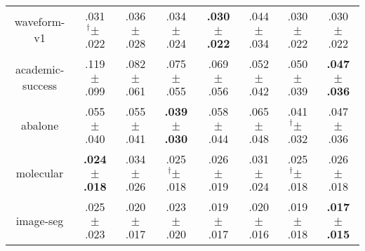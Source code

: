 \begin{tabular}{|c|ccccccc|}
waveform-v1 & .031$^{\dag}\pm^{\phantom{\dag}}$.022\cellcolor{green!34} & .036$^{\phantom{\dag}}\pm^{\phantom{\dag}}$.028\cellcolor{green!3} & .034$^{\phantom{\dag}}\pm^{\phantom{\dag}}$.024\cellcolor{green!16} & \textbf{.030$^{\phantom{\dag}}\pm^{\phantom{\dag}}$.022}\cellcolor{green!40} & .044$^{\phantom{\dag}}\pm^{\phantom{\dag}}$.034\cellcolor{red!40} & .030$^{\phantom{\dag}}\pm^{\phantom{\dag}}$.022\cellcolor{green!36} & .030$^{\phantom{\dag}}\pm^{\phantom{\dag}}$.022\cellcolor{green!36} \\
academic-success & .119$^{\phantom{\dag}}\pm^{\phantom{\dag}}$.099\cellcolor{red!40} & .082$^{\phantom{\dag}}\pm^{\phantom{\dag}}$.061\cellcolor{green!1} & .075$^{\phantom{\dag}}\pm^{\phantom{\dag}}$.055\cellcolor{green!8} & .069$^{\phantom{\dag}}\pm^{\phantom{\dag}}$.056\cellcolor{green!15} & .052$^{\phantom{\dag}}\pm^{\phantom{\dag}}$.042\cellcolor{green!34} & .050$^{\phantom{\dag}}\pm^{\phantom{\dag}}$.039\cellcolor{green!36} & \textbf{.047$^{\phantom{\dag}}\pm^{\phantom{\dag}}$.036}\cellcolor{green!40} \\
abalone & .055$^{\phantom{\dag}}\pm^{\phantom{\dag}}$.040\cellcolor{red!7} & .055$^{\phantom{\dag}}\pm^{\phantom{\dag}}$.041\cellcolor{red!8} & \textbf{.039$^{\phantom{\dag}}\pm^{\phantom{\dag}}$.030}\cellcolor{green!40} & .058$^{\phantom{\dag}}\pm^{\phantom{\dag}}$.044\cellcolor{red!17} & .065$^{\phantom{\dag}}\pm^{\phantom{\dag}}$.048\cellcolor{red!40} & .041$^{\dag}\pm^{\phantom{\dag}}$.032\cellcolor{green!35} & .047$^{\phantom{\dag}}\pm^{\phantom{\dag}}$.036\cellcolor{green!15} \\
molecular & \textbf{.024$^{\phantom{\dag}}\pm^{\phantom{\dag}}$.018}\cellcolor{green!40} & .034$^{\phantom{\dag}}\pm^{\phantom{\dag}}$.026\cellcolor{red!40} & .025$^{\dag}\pm^{\phantom{\dag}}$.018\cellcolor{green!34} & .026$^{\phantom{\dag}}\pm^{\phantom{\dag}}$.019\cellcolor{green!27} & .031$^{\phantom{\dag}}\pm^{\phantom{\dag}}$.024\cellcolor{red!11} & .025$^{\dag}\pm^{\phantom{\dag}}$.018\cellcolor{green!29} & .026$^{\phantom{\dag}}\pm^{\phantom{\dag}}$.018\cellcolor{green!28} \\
image-seg & .025$^{\phantom{\dag}}\pm^{\phantom{\dag}}$.023\cellcolor{red!40} & .020$^{\phantom{\dag}}\pm^{\phantom{\dag}}$.017\cellcolor{green!7} & .023$^{\phantom{\dag}}\pm^{\phantom{\dag}}$.020\cellcolor{red!21} & .019$^{\phantom{\dag}}\pm^{\phantom{\dag}}$.017\cellcolor{green!23} & .020$^{\phantom{\dag}}\pm^{\phantom{\dag}}$.016\cellcolor{green!12} & .019$^{\phantom{\dag}}\pm^{\phantom{\dag}}$.018\cellcolor{green!18} & \textbf{.017$^{\phantom{\dag}}\pm^{\phantom{\dag}}$.015}\cellcolor{green!40} \\

\end{tabular}
